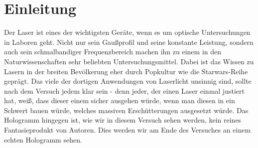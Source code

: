 

\chapter{Einleitung}
\label{chap:einleitung}

Der Laser ist eines der wichtigsten Geräte, wenn es um optische Untersuchungen in Laboren geht. Nicht nur sein Gaußprofil 
und seine konstante Leistung, sondern auch sein schmalbandiger Frequenzbereich machen ihn zu einem in den Naturwissenschaften sehr beliebten 
Untersuchungsmittel. Dabei ist das Wissen zu Lasern in der breiten Bevölkerung eher durch Popkultur wie die Starwars-Reihe geprägt.
Das viele der dortigen Anwendungen von Laserlicht unsinnig sind, sollte nach dem Versuch jedem klar sein - denn jeder, der einen Laser einmal
justiert hat, weiß, dass dieser einem sicher ausgehen würde, wenn man diesen in ein Schwert bauen würde, welches massiven Erschütterungen ausgesetzt
würde. Das Hologramm hingegen ist, wie wir in diesem Versuch sehen werden, kein reines Fantasieprodukt von Autoren.
Dies werden wir am Ende des Versuches an einem echten Hologramm sehen.